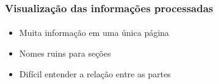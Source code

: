 \documentclass{beamer}
\begin{document}
\begin{frame}
  \frametitle{Visualização das informações processadas}
  \framesubtitle{}

  \begin{itemize}
    \item Muita informação em uma única página
      \vspace{.5cm}
    \item Nomes ruins para seções
      \vspace{.5cm}
    \item Difícil entender a relação entre as partes
  \end{itemize}
\end{frame}
\end{document}
